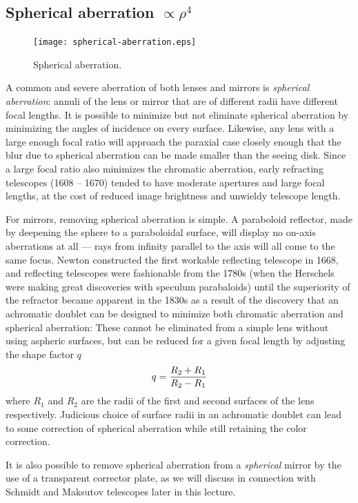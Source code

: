 \subsection{Spherical aberration $\propto\rho^4$}

\begin{figure}[th!]
	\centering
	\texttt{[image: spherical-aberration.eps]}
  \caption{Spherical aberration.}
  \label{fig:spherical-aberration}
\end{figure}

A common and severe aberration of both lenses and mirrors is {\it spherical 
aberration}: annuli of the lens or mirror that are of different radii have 
different focal lengths. It is possible to minimize but not eliminate spherical
aberration by minimizing the angles of incidence on every surface. Likewise,
any lens with a large enough focal ratio will approach the paraxial case closely enough
that the blur due to spherical aberration can be made smaller than the seeing disk.
Since a large focal ratio also minimizes the chromatic aberration, early refracting telescopes 
(1608 -- 1670) tended to have moderate apertures and large focal lengths, at the cost
of reduced image brightness and unwieldy telescope length.

For mirrors, removing spherical aberration is simple. A paraboloid reflector, 
made by deepening the sphere to a paraboloidal surface, 
will display no on-axis aberrations at all --- rays from infinity parallel to 
the axis will all come to the same focus. Newton constructed the first 
workable reflecting telescope in 1668, and reflecting
telescopes were fashionable from the 1780s (when the Herschels were making great
discoveries with speculum parabaloids) until the superiority of the refractor became
apparent in the 1830s as a result of the discovery that an achromatic doublet can be 
designed to minimize both chromatic aberration and spherical aberration:  
These cannot be
eliminated from a simple lens without using aspheric surfaces, but can be
reduced for a given focal length by adjusting the shape factor $q$
\[
q={R_2+R_1\over R_2-R_1}
\]
where $R_1$ and $R_2$ are the radii of the first and second surfaces 
of the lens respectively. Judicious choice of surface radii in an 
achromatic doublet can lead to some correction of spherical aberration while
still retaining the color correction. 

It is also possible to remove spherical aberration from a {\it spherical} mirror by 
the use of a transparent corrector plate, as we will discuss in connection with
Schmidt and Maksutov telescopes later in this lecture.

